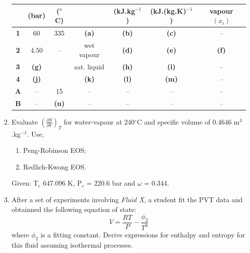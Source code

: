 \documentclass[12pts,a4paper,amsmath,amssymb,floatfix]{article}%
\newcommand{\frc}{\displaystyle\frac}
\begin{document}
\begin{enumerate}[label=\bfseries Problem \arabic*:]
\begin{center}
\begin{tabular} {||c | c c c c c c || }
            & {\bf (bar)}& {\bf ($^{o}$C)} &               & {\bf (kJ.kg$^{-1}$)} & {\bf (kJ.(kg.K)$^{-1}$)} &  {\bf vapour $\left(x_{i}\right)$} \\
\hline\hline
 {\bf 1 }   & 60         & 335            &   {\bf (a)}    & {\bf (b)}           & {\bf (c)}               &   --          \\
 {\bf 2 }   & 4.50       &  --            &   wet vapour   & {\bf (d)}           & {\bf (e)}               &   {\bf (f)}    \\
 {\bf 3 }   & {\bf(g)}   &                &   sat. liquid  & {\bf (h)}           & {\bf (i)}               &   --            \\
 {\bf 4 }   & {\bf(j)}   &                &   {\bf (k)}    & {\bf (l)}           & {\bf (m)}               &   --            \\
 {\bf A }   & --         & 15             &   --           & --                  & --                      &   --     \\
 {\bf B }   & --         & {\bf (n)}      &   --           & --                  & --                      &   --         \\
 \hline\hline
\end{tabular}
\end{center}


\item\label{SolvedExample2} Evaluate $\left(\frc{\partial S}{\partial V}\right)_{T}$ for  water-vapour at 240$^{\circ}$C and specific volume of 0.4646 m$^{3}$.kg$^{-1}$. Use,
\begin{enumerate}
\item Peng-Robinson EOS;
\item Redlich-Kwong EOS.
\end{enumerate}
Given: T$_{c}$ 647.096 K, P$_{c}$ = 220.6 bar and $\omega$ = 0.344.

\item After a set of experiments involving {\it Fluid X}, a student fit the PVT data and obtainned the following equation of state:
\begin{displaymath}
  V = \frc{RT}{P} - \frc{\phi_{2}}{T^{3}}
\end{displaymath}
where $\phi_{2}$ is a fitting constant. Derive expressions for enthalpy and entropy for this fluid assuming isothermal processes.


\end{enumerate}
\end{document}
